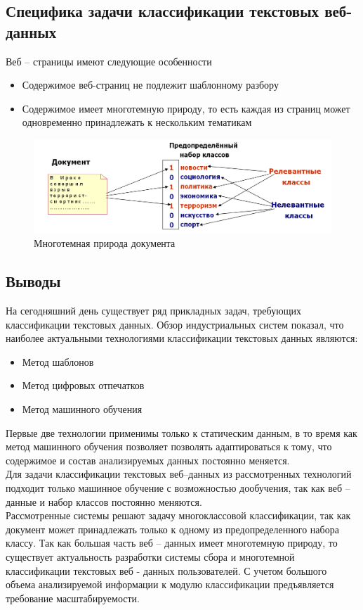 \documentclass[russian, utf8, emptystyle]{eskdtext}
\begin{document}
\subsection{Специфика задачи классификации текстовых веб-данных}
Веб – страницы имеют следующие особенности
\begin{itemize}
	\item Содержимое веб-страниц не подлежит шаблонному разбору
	\item Содержимое имеет многотемную природу, то есть каждая  из страниц может одновременно принадлежать к нескольким тематикам
\end{itemize}
	\begin{figure}[h]
		\begin{center}
			\includegraphics[width=14cm]{pic/Nature.png}
			\caption{Многотемная природа документа}
			\label{fig:low_sigma}
		\end{center}
	\end{figure}
\subsection{Выводы}
На сегодняшний день существует ряд прикладных задач, требующих классификации текстовых данных. Обзор индустриальных систем показал, что наиболее актуальными технологиями классификации текстовых данных являются:
\begin{itemize}
	\item Метод шаблонов
	\item Метод цифровых отпечатков
	\item Метод машинного обучения
\end{itemize}

Первые две технологии применимы только к статическим данным, в то время как метод машинного обучения позволяет позволять адаптироваться к тому, что содержимое и состав анализируемых данных постоянно меняется.\\
Для задачи классификации текстовых веб–данных из рассмотренных технологий подходит только машинное обучение с возможностью дообучения, так как веб – данные и набор классов постоянно меняются. \\
Рассмотренные системы решают задачу многоклассовой классификации, так как документ может принадлежать только к одному из предопределенного набора классу. Так как большая часть веб – данных имеет многотемную природу, то существует актуальность разработки системы сбора и многотемной классификации текстовых веб - данных пользователей. С учетом большого объема анализируемой информации к модулю классификации предъявляется требование масштабируемости. \\
\end{document}
